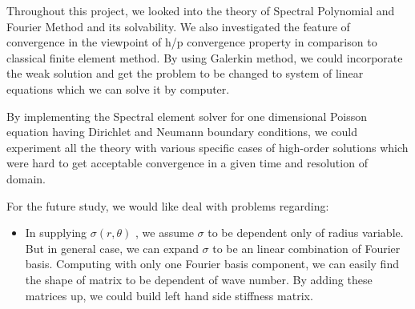 
Throughout this project, we looked into the theory of Spectral Polynomial and Fourier Method and its solvability. We also investigated the feature of convergence in the viewpoint of h/p convergence property in comparison to classical finite element method. By using Galerkin method, we could incorporate the weak solution and get the problem to be changed to system of linear equations which we can solve it by computer.

By implementing the Spectral element solver for one dimensional Poisson equation having Dirichlet and Neumann boundary conditions, we could experiment all the theory with various specific cases of high-order solutions which were hard to get acceptable convergence in a given time and resolution of domain.  

For the future study, we would like deal with problems regarding:

\begin{itemize}
\item
In supplying $\sigma(r,\theta)$ , we assume $\sigma$ to be dependent only of radius variable. But in general case, we can expand $\sigma$ to be an linear combination of Fourier basis. Computing with only one Fourier basis component, we can easily find the shape of matrix to be dependent of wave number. By adding these matrices up, we could build left hand side stiffness matrix.  
\end{itemize}
